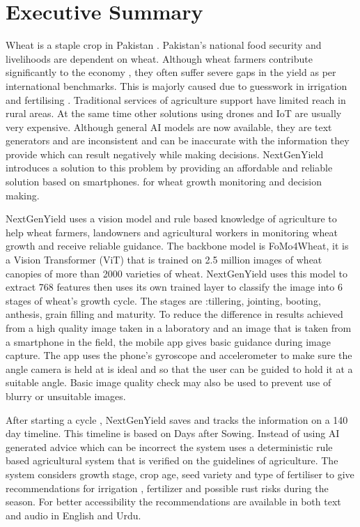 \documentclass{FastFyp}
\begin{document}
\section*{Executive Summary}
Wheat is a staple crop in Pakistan . Pakistan’s national food security and livelihoods are dependent on wheat. Although wheat farmers contribute significantly to the economy , they often suffer severe gaps in the yield as per international benchmarks. This is majorly caused due to guesswork in irrigation and fertilising . Traditional services of agriculture support have limited reach in rural areas. At the same time other solutions using drones and IoT are usually very expensive. Although general AI models are now available, they are text generators and are inconsistent and can be inaccurate with the information they provide which can result negatively while making decisions. NextGenYield introduces a solution to this problem by providing an affordable and reliable solution based on smartphones. for wheat growth monitoring and decision making. 

NextGenYield uses a vision model and rule based knowledge of agriculture to help wheat farmers, landowners and agricultural workers in monitoring wheat growth and receive reliable guidance. The backbone model is FoMo4Wheat, it is a Vision Transformer (ViT) that is trained on 2.5 million images of wheat canopies of more than 2000 varieties of wheat. NextGenYield uses this model to extract 768 features then uses its own trained layer to classify the image into 6 stages of wheat’s growth cycle. The stages are :tillering, jointing, booting, anthesis, grain filling and maturity.
To reduce the difference in results achieved from a high quality image taken in a laboratory and an image that is taken from a smartphone in the field, the mobile app gives basic guidance during image capture. The app uses the phone's gyroscope and accelerometer to make sure the angle camera is held at is ideal and so that the user can be guided to hold it at a suitable angle. Basic image quality check may also be used to prevent use of blurry or unsuitable images.

After starting a cycle , NextGenYield saves and tracks the information on a 140 day timeline. This timeline is based on Days after Sowing. Instead of using AI generated advice which can be incorrect  the system uses a deterministic rule based agricultural system that is verified on the guidelines of agriculture. The system considers growth stage, crop age, seed variety and type of fertiliser to give recommendations for irrigation , fertilizer and possible rust risks during the season. For better accessibility the recommendations are available in both text and audio in English and Urdu.
\end{document}
